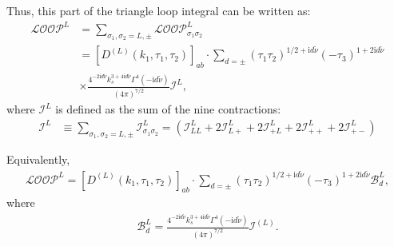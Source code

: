 \documentclass[a4paper,12pt]{article}
\def\ii{\mathrm{i}}
\def\si{\sigma}
\def\tn{\tilde\nu}
\begin{document}
Thus, this part of the triangle loop integral can be written as:
\begin{align}
    \mathcal{LOOP}^{L} 
    &= \sum_{\si_1,\si_2=L,\pm} 
    \mathcal{LOOP}^{L}_{\si_1\si_2} \nonumber \\
    &= \left[D^{(L)}(k_1,\tau_1,\tau_2)\right]_{ab} \cdot
    \sum_{d=\pm} (\tau_1\tau_2)^{1/2+\ii d\tn}(-\tau_3)^{1+2\ii d\tn} \nonumber \\
    &\times \frac{4^{-2\ii d\tn} k_s^{3+4\ii d\tn} \Gamma^4(-\ii d\tn)}{(4\pi)^{7/2}}
    \mathcal{I}^{L},
\end{align}
where $\mathcal{I}^L$ is defined as the sum of the nine contractions:
\begin{align}
    \mathcal{I}^{L}
    &\equiv \sum_{\si_1,\si_2=L,\pm} \mathcal{I}^{L}_{\si_1\si_2}
    = (\mathcal{I}^{L}_{LL}
    +2\mathcal{I}^{L}_{L+}
    +2\mathcal{I}^{L}_{+L}
    +2\mathcal{I}^{L}_{++}
    +2\mathcal{I}^{L}_{+-})
\end{align}

Equivalently,
\begin{align}
    \mathcal{LOOP}^{L}
    =
    \left[D^{(L)}(k_1,\tau_1,\tau_2)\right]_{ab} \cdot
    \sum_{d=\pm}
    (\tau_1\tau_2)^{1/2+\ii d\tn}
    (-\tau_3)^{1+2\ii d\tn}
    \mathcal{B}^L_d,
\end{align}
where
\begin{align}
    \mathcal{B}^L_d
    =\frac{4^{-2\ii d\tn}k_s^{3+4\ii d\tn} \Gamma^4(-\ii d\tn)}{(4\pi)^{7/2}}
    \mathcal{I}^{(L)}.
\end{align}
\end{document}
